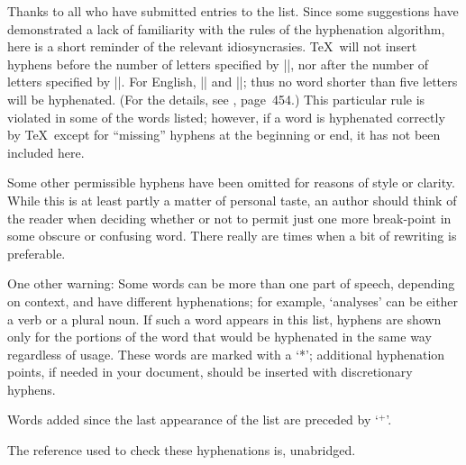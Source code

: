 Thanks to all who have submitted entries to the list.  Since some
suggestions have demonstrated a lack of familiarity with the rules of
the hyphenation algorithm, here is a short reminder of the relevant
idio\-syn\-cras\-ies.  \TeX\ will not insert hyphens before the number
of letters specified by \hbox{|\lefthyphenmin|}, nor after the number of
letters specified by \hbox{|\righthyphenmin|}.  For  English,
\hbox{||} and \hbox{||}; thus no word
shorter than five letters will be hyphenated.  (For the details, see
\TB, page~454.)
This particular rule is violated in some of the words listed; however,
if a word is hyphenated correctly by \TeX\ except for ``missing''
hyphens at the beginning or end, it has not been included here.
{\emergencystretch=5pt\par}

Some other permissible hyphens have been omitted
for reasons of style or clarity.  While this is at
least partly a matter of personal taste, an author should think of the
reader when deciding whether or not to permit just one more break-point
in some obscure or confusing word.  There really are times when a bit of
rewriting is preferable.
{\hfuzz=2.2pt\par}

One other warning: Some words can be more than one part of speech,
depending on context, and have different hyphenations; for example,
`analyses' can be either a verb or a plural noun.  If such a word appears
in this list, hyphens are shown only for the portions of the word that
would be hyphenated in the same way regardless of usage.  These words
are marked with a `*'; additional hyphenation points, if needed in your
document, should be inserted with discretionary hyphens.

Words added since the last appearance of the list are preceded by `${}^+$'.

The reference used to check these hyphenations is, unabridged.

%


